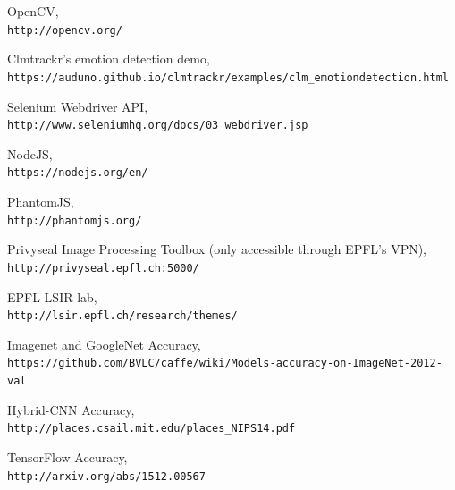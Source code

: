 \documentclass{article}
\begin{document}
\begin{thebibliography}{23}
OpenCV,
\\\texttt{http://opencv.org/}

Clmtrackr's emotion detection demo,
\\\texttt{https://auduno.github.io/clmtrackr/examples/clm\_emotiondetection.html}

Selenium Webdriver API,
\\\texttt{http://www.seleniumhq.org/docs/03\_webdriver.jsp}

NodeJS,
\\\texttt{https://nodejs.org/en/}

PhantomJS,
\\\texttt{http://phantomjs.org/}

Privyseal Image Processing Toolbox (only accessible through EPFL's VPN),
\\\texttt{http://privyseal.epfl.ch:5000/}

EPFL LSIR lab,
\\\texttt{http://lsir.epfl.ch/research/themes/}

Imagenet and GoogleNet Accuracy,
\\\texttt{https://github.com/BVLC/caffe/wiki/Models-accuracy-on-ImageNet-2012-val}

Hybrid-CNN Accuracy,
\\\texttt{http://places.csail.mit.edu/places\_NIPS14.pdf}

TensorFlow Accuracy,
\\\texttt{http://arxiv.org/abs/1512.00567}
\end{thebibliography}
\end{document}
